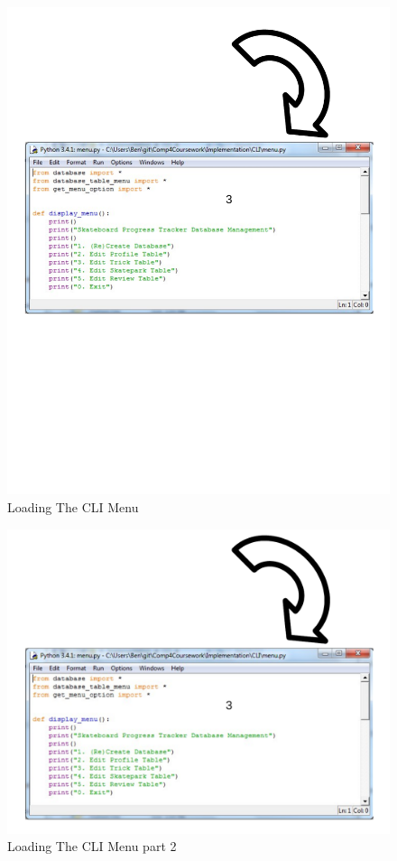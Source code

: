 \begin{figure}[H]
    \includegraphics[width=\textwidth]{./Manual/Images/LoadingCLI.pdf}
    \caption{Loading The CLI Menu} \label{fig:Loading CLI}
\end{figure}

\begin{figure}[H]
    \includegraphics[width=\textwidth]{./Manual/Images/LoadingCLI2.pdf}
    \caption{Loading The CLI Menu part 2} \label{fig:Loading CLI2}
\end{figure}

